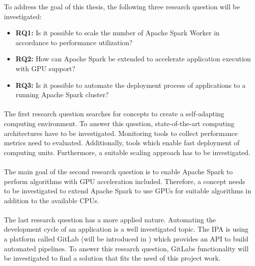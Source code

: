 To address the goal of this thesis, the following three research question will be investigated:
\begin{itemize}
\item \textbf{RQ1:} Is it possible to scale the number of Apache Spark Worker in accordance to performance utilization?
\item \textbf{RQ2:} How can Apache Spark be extended to accelerate application execution with GPU support?
\item \textbf{RQ3:} Is it possible to automate the deployment process of applications to a running Apache Spark cluster?
\end{itemize}


\paragraph{}
The first research question searches for concepts to create a self-adapting computing environment.
To answer this question, state-of-the-art computing architectures have to be investigated.
Monitoring tools to collect performance metrics need to evaluated. Additionally, tools which enable fast deployment of computing units.
Furthermore, a suitable scaling approach has to be investigated.


\paragraph{}
The main goal of the second research question is to enable Apache Spark to perform algorithms with GPU acceleration included.
Therefore, a concept needs to be investigated to extend Apache Spark to use GPUs for suitable algorithms in addition to the available CPUs.


\paragraph{}
The last research question has a more applied nature.
Automating the development cycle of an application is a well investigated topic.
The IPA is using a platform called GitLab (will be introduced in ) which provides an API to build automated pipelines.
To answer this research question, GitLabs functionality will be investigated to find a solution that fits the need of this project work.


